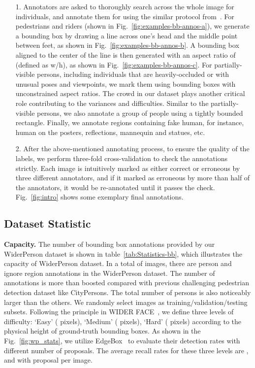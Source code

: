 \documentclass[journal]{IEEEtran}
\begin{document}
\begin{itemize}
\item[1.] Annotators are asked to thoroughly search across the whole image for individuals, and annotate them for using the similar protocol from~\cite{DBLP:conf/cvpr/ZhangBS17}. For pedestrians and riders (shown in Fig.~\ref{fig:examples-bb-annos-a}), we generate a bounding box by drawing a line across one's head and the middle point between feet, as shown in Fig.~\ref{fig:examples-bb-annos-b}. A bounding box aligned to the center of the line is then generated with an aspect ratio of  (defined as w/h), as shown in Fig.~\ref{fig:examples-bb-annos-c}. For partially-visible persons, including individuals that are heavily-occluded or with unusual poses and viewpoints, we mark them using bounding boxes with unconstrained aspect ratios. The crowd in our dataset plays another critical role contributing to the variances and difficulties. Similar to the partially-visible persons, we also annotate a group of people using a tightly bounded rectangle. Finally, we annotate regions containing fake human, for instance, human on the posters, reflections, mannequin and statues, etc.

\item[2.] After the above-mentioned annotating process, to ensure the quality of the labels, we perform three-fold cross-validation to check the annotations strictly. Each image is intuitively marked as either correct or erroneous by three different annotators, and if it marked as erroneous by more than half of the annotators, it would be re-annotated until it passes the check. Fig.~\ref{fig:intro} shows some exemplary final annotations.
\end{itemize}


\subsection{Dataset Statistic} \label{sec:dataset_stat}

{\flushleft \textbf{Capacity. }}
The number of bounding box annotations provided by our WiderPerson dataset is shown in table~\ref{tab:Statistics-bb}, which illustrates the capacity of WiderPerson dataset. In a total of  images, there are  person and  ignore region annotations in the WiderPerson dataset. The number of annotations is more than  boosted compared with previous challenging pedestrian detection dataset like CityPersons. The total number of persons is also noticeably larger than the others. We randomly select  images as training/validation/testing subsets. Following the principle in WIDER FACE~\cite{DBLP:conf/cvpr/YangLLT16}, we define three levels of difficulty: `Easy' ( pixels), `Medium' ( pixels), `Hard' ( pixels) according to the physical height of ground-truth bounding boxes. As shown in the Fig.~\ref{fig:wp_stats}, we utilize EdgeBox~\cite{DBLP:conf/eccv/ZitnickD14} to evaluate their detection rates with different number of proposals. The average recall rates for these three levels are ,  and  with  proposal per image.
\end{document}
